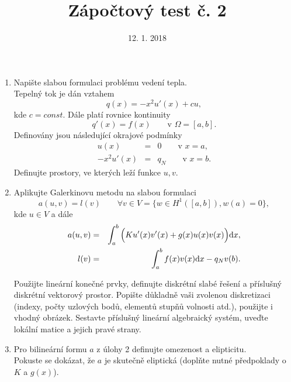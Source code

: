 \documentclass{article}
\def\d{{\rm{d}}}
\begin{document}
\title{Zápočtový test č. 2}
\date{12. 1. 2018}
\author{}
\maketitle

\begin{enumerate}
\item Napište slabou formulaci problému vedení tepla.\\
Tepelný tok je dán vztahem
\[
q(x) = -x^2 u'(x) + cu,
\]
kde $c=const$. Dále platí rovnice kontinuity
\[
q'(x) = f(x) \qquad \textrm{v }\Omega=[a,b].
\]
Definovány jsou následující okrajové podmínky
\begin{eqnarray*}
u(x) &=& 0 \qquad \textrm{v } x=a, \\
-x^2 u'(x) &=& q_N \qquad \textrm{v } x=b.
\end{eqnarray*}
Definujte prostory, ve kterých leží funkce $u,v$.

\item Aplikujte Galerkinovu metodu na slabou formulaci
\begin{equation*}
    a(u,v) = l(v) \qquad \forall v\in V=\{w\in H^1([a,b]), w(a)=0\},
\end{equation*}
kde $u\in V$ a dále
\begin{eqnarray*}
    a(u,v) &=& \int_a^b \Big( Ku'(x)v'(x) + g(x)u(x)v(x) \Big) \d x, \\
    l(v) &=& \int_a^b f(x)v(x) \d x - q_N v(b).
\end{eqnarray*}

Použijte lineární konečné prvky, definujte diskrétní slabé řešení a příslušný diskrétní vektorový prostor.
Popište důkladně vaši zvolenou diskretizaci (indexy, počty uzlových bodů, elementů stupňů volnosti atd.), 
použijte i vhodný obrázek.
Sestavte příslušný lineární algebraický systém, uveďte lokální matice a jejich pravé strany.

\item
Pro bilineární formu $a$ z úlohy 2 definujte omezenost a elipticitu.\\
Pokuste se dokázat, že $a$ je skutečně eliptická (doplňte nutné předpoklady o $K$ a $g(x)$).

\end{enumerate}
\end{document}
